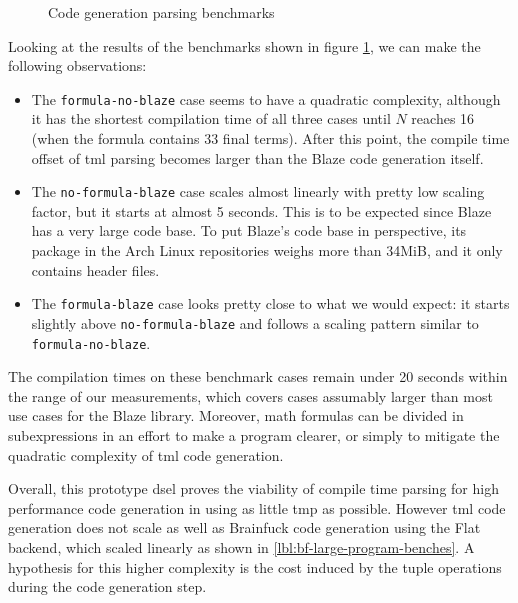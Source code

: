 \documentclass[../main]{subfiles}
\begin{document}
\begin{figure}[h]

\caption{Code generation parsing benchmarks}
\label{fig:tml-ctbench}
\end{figure}

Looking at the results of the benchmarks shown in figure \ref{fig:tml-ctbench},
we can make the following observations:

\begin{itemize}

\item
The \lstinline{formula-no-blaze} case seems to have a quadratic complexity,
although it has the shortest compilation time of all three cases until $N$
reaches 16 (\ie when the formula contains 33 final terms).
After this point, the compile time offset of \gls{tml} parsing becomes larger
than the Blaze code generation itself.

\item
The \lstinline{no-formula-blaze} case scales almost linearly with pretty low
scaling factor, but it starts at almost 5 seconds.
This is to be expected since Blaze has a very large code base.
To put Blaze's code base in perspective, its package in the Arch Linux
repositories weighs more than 34MiB, and it only contains \cpp header files.

\item
The \lstinline{formula-blaze} case looks pretty close to what we would expect:
it starts slightly above \lstinline{no-formula-blaze} and follows a scaling
pattern similar to \lstinline{formula-no-blaze}.

\end{itemize}

The compilation times on these benchmark cases remain under 20 seconds
within the range of our measurements, which covers cases assumably larger
than most use cases for the Blaze library.
Moreover, math formulas can be divided in subexpressions in an effort to
make a program clearer, or simply to mitigate the quadratic complexity
of \gls{tml} code generation.

Overall, this prototype \gls{dsel} proves the viability of compile time parsing
for high performance code generation in  using as little \gls{tmp}
as possible.
However \gls{tml} code generation does not scale as well as Brainfuck
code generation using the Flat backend, which scaled linearly as shown in
\ref{lbl:bf-large-program-benches}. A hypothesis for this higher complexity
is the cost induced by the tuple operations during the code generation step.
\end{document}
